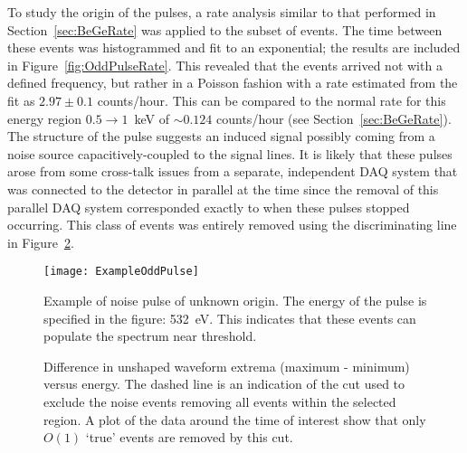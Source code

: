 	To study the origin of the pulses, a rate analysis similar to that performed in Section~\ref{sec:BeGeRate} was applied to the subset of events.  The time between these events was histogrammed and fit to an exponential; the results are included in Figure~\ref{fig:OddPulseRate}.  This revealed that the events arrived not with a defined frequency, but rather in a Poisson fashion with a rate estimated from the fit as $2.97 \pm 0.1$ counts/hour.  This can be compared to the normal rate for this energy region $0.5\to1$~keV of $\sim0.124$ counts/hour (see Section~\ref{sec:BeGeRate}).  The structure of the pulse suggests an induced signal possibly coming from a noise source capacitively-coupled to the signal lines.  It is likely that these pulses arose from some cross-talk issues from a separate, independent DAQ system that was connected to the detector in parallel at the time since the removal of this parallel DAQ system corresponded exactly to when these pulses stopped occurring.  This class of events was entirely removed using the discriminating line in Figure~\ref{fig:OddPulseCut}.
	
	
			\begin{figure}
				\centering
				\texttt{[image: ExampleOddPulse]}
				\caption[Example of noise pulse of unknown origin]
				{Example of noise pulse of unknown origin.  The energy of the pulse is specified in the figure: 532~eV. 
				This indicates that these events can populate the spectrum near threshold.}
				\label{fig:OddPulseExample}
			\end{figure}	

			\begin{figure}
				\centering
				\def\plotwidth{0.8\textwidth}
				\caption[Difference in unshaped waveform extrema versus energy]
				{Difference in unshaped waveform extrema (maximum - minimum) versus energy.  The dashed line is an indication of the cut used to exclude the 
				noise events removing all events within the selected region.  A plot of the data around the time of interest
				show that only $O(1)$ `true' events are removed by this cut.  }
				\label{fig:OddPulseCut}
			\end{figure}

